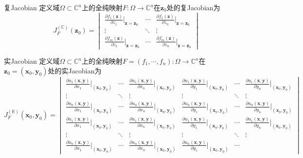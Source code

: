 \documentclass[lang = cn, scheme = chinese, thmcnt = section]{elegantbook}
\newcommand{\R}{\mathbb{R}}            %
\newcommand{\C}{\mathbb{C}}  		   %
\newcommand{\sub}{\subset}             %
\newcommand{\bs}{\boldsymbol}          %
\begin{document}
\begin{definition}{复Jacobian}
	定义域$\Omega\sub\C^n$上的全纯映射$F:\Omega\to\C^n$在$\bs{z}_0$处的复Jacobian为%
	$$
	J_F^{(\C)}(\bs{z}_0)=\begin{vmatrix}
		\frac{\partial f_1(\bs{z})}{\partial z_1}|_{\bs{z}=\bs{z}_0} & \cdots & \frac{\partial f_1(\bs{z})}{\partial z_n}|_{\bs{z}=\bs{z}_0}\\
		\vdots & \ddots & \vdots\\
		\frac{\partial f_m(\bs{z})}{\partial z_1}|_{\bs{z}=\bs{z}_0} & \cdots & \frac{\partial f_m(\bs{z})}{\partial z_n}|_{\bs{z}=\bs{z}_0}
	\end{vmatrix}
	$$
\end{definition}

\begin{definition}{实Jacobian}
	定义域$\Omega\sub\C^n$上的全纯映射$F=(f_1,\cdots,f_n):\Omega\to\C^n$在$\bs{z}_0=(\bs{x}_0,\bs{y}_0)$处的实Jacobian为%
	$$
	J_F^{(\R)}(\bs{x}_0,\bs{y}_0)=\begin{vmatrix}
		\frac{\partial u_1(\bs{x},\bs{y})}{\partial x_1}|_{(\bs{x}_0,\bs{y}_0)}
		& \cdots &
		\frac{\partial u_1(\bs{x},\bs{y})}{\partial x_n}|_{(\bs{x}_0,\bs{y}_0)}
		&
		\frac{\partial u_1(\bs{x},\bs{y})}{\partial y_1}|_{(\bs{x}_0,\bs{y}_0)}
		& \cdots &
		\frac{\partial u_1(\bs{x},\bs{y})}{\partial y_n}|_{(\bs{x}_0,\bs{y}_0)}\\
		\vdots & \ddots & \vdots & \vdots & \ddots & \vdots\\
		\frac{\partial u_n(\bs{x},\bs{y})}{\partial x_1}|_{(\bs{x}_0,\bs{y}_0)}
		& \cdots &
		\frac{\partial u_n(\bs{x},\bs{y})}{\partial x_n}|_{(\bs{x}_0,\bs{y}_0)}
		&
		\frac{\partial u_n(\bs{x},\bs{y})}{\partial y_1}|_{(\bs{x}_0,\bs{y}_0)}
		& \cdots &
		\frac{\partial u_n(\bs{x},\bs{y})}{\partial y_n}|_{(\bs{x}_0,\bs{y}_0)}\\
		\frac{\partial u_1(\bs{x},\bs{y})}{\partial x_1}|_{(\bs{x}_0,\bs{y}_0)}
		& \cdots &
		\frac{\partial u_1(\bs{x},\bs{y})}{\partial x_n}|_{(\bs{x}_0,\bs{y}_0)}
		&
		\frac{\partial u_1(\bs{x},\bs{y})}{\partial y_1}|_{(\bs{x}_0,\bs{y}_0)}
		& \cdots &
		\frac{\partial u_1(\bs{x},\bs{y})}{\partial y_n}|_{(\bs{x}_0,\bs{y}_0)}\\
		\vdots & \ddots & \vdots & \vdots & \ddots & \vdots\\
		\frac{\partial u_n(\bs{x},\bs{y})}{\partial x_1}|_{(\bs{x}_0,\bs{y}_0)}
		& \cdots &
		\frac{\partial u_n(\bs{x},\bs{y})}{\partial x_n}|_{(\bs{x}_0,\bs{y}_0)}
		&
		\frac{\partial u_n(\bs{x},\bs{y})}{\partial y_1}|_{(\bs{x}_0,\bs{y}_0)}
		& \cdots &

\end{vmatrix}$$
\end{definition}
\end{document}
